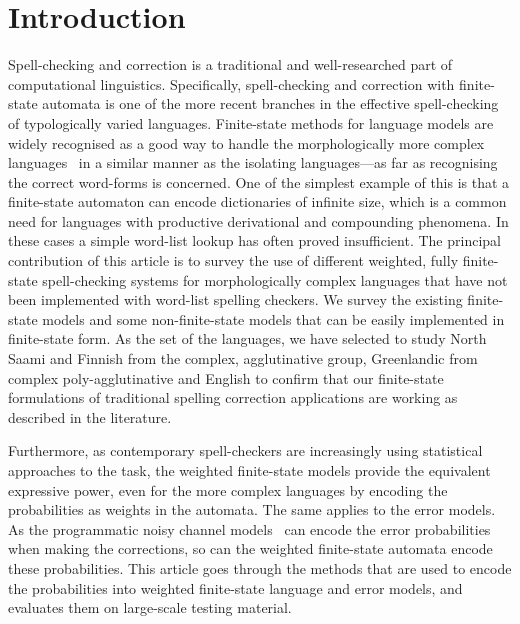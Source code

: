 \documentclass[a4paper,12pt]{article}
\begin{document}
\makeatletter\let\chapter\@undefined\makeatother
\listoftodos

\section{Introduction} 

Spell-checking and correction is a traditional and well-researched part of
computational linguistics. Specifically, spell-checking and correction with
finite-state automata is one of the more recent branches in the effective
spell-checking of typologically varied languages. Finite-state methods for
language models are widely recognised as a good way to handle the
morphologically more complex languages~\cite[]{beesley2003finite} in a similar
manner as the isolating languages---as far as recognising the correct
word-forms is concerned. One of the simplest example of this is that a
finite-state automaton can encode dictionaries of infinite size, which is a
common need for languages with productive derivational and compounding
phenomena.  In these cases a simple word-list lookup has often proved
insufficient. The principal contribution of this article is to survey the use
of different weighted, fully finite-state spell-checking systems for
morphologically complex languages that have not been implemented with word-list
spelling checkers.  We survey the existing finite-state models and some
non-finite-state models that can be easily implemented in finite-state form.
As the set of the languages, we have selected to study North Saami and Finnish
from the complex, agglutinative group, Greenlandic from complex
poly-agglutinative and English to confirm that our finite-state formulations of
traditional spelling correction applications are working as described in the
literature.

Furthermore, as contemporary spell-checkers are increasingly using statistical
approaches to the task, the weighted finite-state models provide the equivalent
expressive power, even for the more complex languages by encoding the
probabilities as weights in the automata.  The same applies to the error
models. As the programmatic noisy channel models~\cite[]{brill2000improved} can
encode the error probabilities when making the corrections, so can the weighted
finite-state automata encode these probabilities. This article goes through the
methods that are used to encode the probabilities into weighted finite-state
language and error models, and evaluates them on large-scale testing material.
\end{document}
